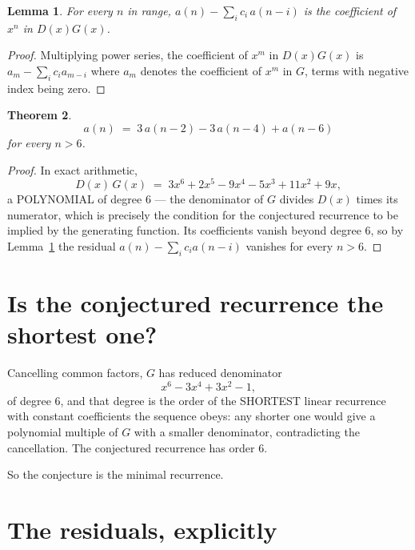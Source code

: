 \documentclass[11pt,a4paper]{article}
\theoremstyle{plain}
\newtheorem{theorem}{Theorem}
\newtheorem{lemma}[theorem]{Lemma}
\theoremstyle{definition}
\begin{document}
\begin{lemma}\label{lem:key}
For every $n$ in range, $a(n)-\sum_i c_i\,a(n-i)$ is the coefficient of $x^{n}$ in
$D(x)G(x)$.
\end{lemma}

\begin{proof}
Multiplying power series, the coefficient of $x^{m}$ in $D(x)G(x)$ is
$a_m-\sum_i c_i a_{m-i}$ where $a_m$ denotes the coefficient of $x^{m}$ in $G$, terms with
negative index being zero.
\end{proof}

\begin{theorem}
\[
a(n)\;=\;3\,a(n-2) - 3\,a(n-4) + a(n-6)
\]
for every $n>6$.
\end{theorem}

\begin{proof}
In exact arithmetic,
\[
D(x)\,G(x)\;=\;3 x^{6} + 2 x^{5} - 9 x^{4} - 5 x^{3} + 11 x^{2} + 9 x,
\]
a POLYNOMIAL of degree $6$ --- the denominator of $G$ divides $D(x)$ times its numerator,
which is precisely the condition for the conjectured recurrence to be implied by the
generating function. Its coefficients vanish beyond degree $6$, so by
Lemma~\ref{lem:key} the residual $a(n)-\sum_ic_ia(n-i)$ vanishes for every
$n>6$.
\end{proof}

\section{Is the conjectured recurrence the shortest one?}

Cancelling common factors, $G$ has reduced denominator
\[
x^{6} - 3 x^{4} + 3 x^{2} - 1,
\]
of degree $6$, and that degree is the order of the SHORTEST linear recurrence with
constant coefficients the sequence obeys: any shorter one would give a polynomial multiple of
$G$ with a smaller denominator, contradicting the cancellation. The conjectured recurrence has
order $6$.

So the conjecture is the minimal recurrence.

\section{The residuals, explicitly}
\end{document}
